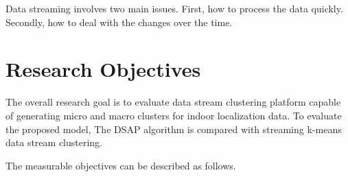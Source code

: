 \documentclass[../UNBThesis2.tex]{subfiles}
\begin{document}
Data streaming involves two main issues. First, how to process the data quickly.
Secondly, how to deal with the changes over the time.











\section{Research Objectives}

The overall research goal is to evaluate data stream clustering platform capable of generating micro and macro clusters for indoor localization data. To evaluate the proposed model, The DSAP algorithm is compared with streaming k-means data stream clustering.

The measurable objectives can be described as follows. 
\end{document}
